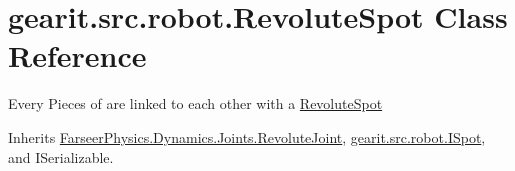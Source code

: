 \hypertarget{classgearit_1_1src_1_1robot_1_1_revolute_spot}{\section{gearit.\+src.\+robot.\+Revolute\+Spot Class Reference}
\label{classgearit_1_1src_1_1robot_1_1_revolute_spot}
}


Every Pieces of are linked to each other with a \hyperlink{classgearit_1_1src_1_1robot_1_1_revolute_spot}{Revolute\+Spot}  




Inherits \hyperlink{class_farseer_physics_1_1_dynamics_1_1_joints_1_1_revolute_joint}{Farseer\+Physics.\+Dynamics.\+Joints.\+Revolute\+Joint}, \hyperlink{interfacegearit_1_1src_1_1robot_1_1_i_spot}{gearit.\+src.\+robot.\+I\+Spot}, and I\+Serializable.


